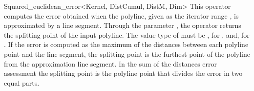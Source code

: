 \begin{ccRefClass}{Squared_euclidean_error<Kernel, DistCumul, DistM, Dim>}
{This operator computes the error obtained when the polyline, given as the iterator range \ccc{[begin, beyond)},
is approximated by a line segment. Through the parameter , the operator returns the 
splitting point of the input polyline.  The value type of  must be , for ,
and, for .
If the error is computed as the maximum of the distances between each
polyline point and the line segment, the splitting point is the furthest
point of the polyline from the approximation line segment. In the sum of
the distances error assessment the splitting point is the polyline point
that divides the error in two equal parts.}


\ccSeeAlso


\end{ccRefClass}

